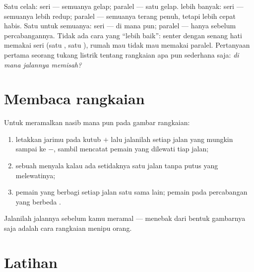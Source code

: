 \begin{remark}\label{rem:g5:series-parallel-circuits:compare}
Satu celah: seri --- semuanya gelap; paralel --- satu  gelap.
 lebih banyak: seri --- semuanya lebih redup; paralel ---
semuanya terang penuh, tetapi  lebih cepat habis. Satu
 untuk semuanya: seri --- di mana pun; paralel --- hanya
sebelum percabangannya. Tidak ada cara yang ``lebih baik'': senter
dengan senang hati memakai seri (satu , satu ), rumah mau
tidak mau memakai paralel. Pertanyaan pertama seorang tukang listrik
tentang rangkaian apa pun sederhana saja: \emph{di mana jalannya
memisah?}
\end{remark}

\section{Membaca rangkaian}

\begin{method}\label{met:g5:series-parallel-circuits:follow}
Untuk meramalkan nasib  mana pun pada gambar rangkaian:
\begin{enumerate}
  \item letakkan jarimu pada kutub $+$  lalu jalanilah setiap
        jalan yang mungkin sampai ke $-$, sambil mencatat pemain yang
        dilewati tiap jalan;
  \item sebuah  menyala kalau ada setidaknya satu jalan tanpa
        putus yang melewatinya;
  \item pemain yang berbagi setiap jalan  satu sama
        lain; pemain pada percabangan yang berbeda .
\end{enumerate}
Jalanilah jalannya sebelum kamu meramal --- menebak dari bentuk
gambarnya saja adalah cara rangkaian menipu orang.
\end{method}

\section{Latihan}

